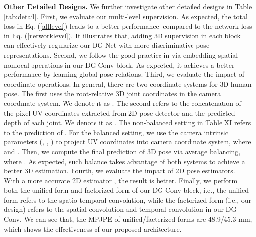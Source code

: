 \documentclass[journal]{IEEEtran}
\begin{document}
\textbf{Other Detailed Designs.} We further investigate other detailed designs  in Table \ref{tab:detail}.
First,
we evaluate our multi-level supervision.
As expected,
the total loss in Eq. (\ref{alllevel}) leads to a better performance,
compared to the network loss in Eq. (\ref{networklevel}).
It illustrates that,
adding 3D supervision in each block can effectively regularize our DG-Net with more discriminative pose representations.
Second,
we follow the good practice in \cite{semanticsgcn} via embedding spatial nonlocal operations in our DG-Conv block.
As expected,
it achieves a better performance by learning global pose relations.
Third,
we evaluate the impact of coordinate operations.
In general,
there are two coordinate systems for 3D human pose.
The first uses the root-relative 3D joint coordinates in the camera coordinate system.
We denote it as .
The second refers to the concatenation of
the pixel UV coordinates extracted from 2D pose detector
and
the predicted depth of each joint.
We denote it as .
The non-balanced setting in Table XI refers to the prediction of .
For the balanced setting,
we use the camera intrinsic parameters (, , ) to project UV coordinates into camera coordinate system,
where
 and .
Then,
we compute the final prediction of 3D pose via average balancing,
where
.
As expected,
such balance takes advantage of both systems to achieve a better 3D estimation.
Fourth,
we evaluate the impact of 2D pose estimators.
With a more accurate 2D estimator \cite{cpn},
the result is better.
Finally,
we perform both the unified form and factorized form of our DG-Conv block,
i.e.,
the unified form refers to the spatio-temporal convolution,
while
the factorized form (i.e., our design) refers to the spatial convolution and temporal convolution in our DG-Conv.
We can see that,
the MPJPE of unified/factorized forms are 48.9/45.3 mm,
which shows the effectiveness of our proposed architecture.
\end{document}
